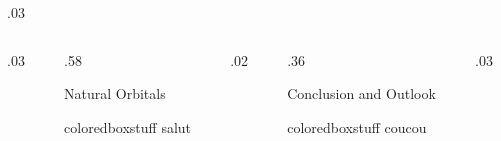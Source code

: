 \documentclass[final, hyperref={pdfpagelabels=false}]{beamer}
\begin{document}
\begin{frame}[t]
\begin{columns}[t]
\begin{column}{.03\textwidth}
\end{column} %
\end{columns} %
\vspace{-0.75em}



\begin{columns}[t]  %

\begin{column}{.03\textwidth}
\end{column} %

\begin{column}{.58\textwidth} %
\begin{block}{\color{cyan!40}Natural Orbitals\vphantom{Xy}}
\begin{beamercolorbox}[wd=\textwidth]{coloredboxstuff}
salut

\end{beamercolorbox}
\end{block}
\end{column}

\begin{column}{.02\textwidth}
\end{column}	%

\begin{column}{.36\textwidth} %
\begin{block}{\color{ta2orange!30!tabutter!30} Conclusion and Outlook\vphantom{Xy}}
\begin{beamercolorbox}[wd=\textwidth]{coloredboxstuff}
coucou

\end{beamercolorbox}
\end{block}
\end{column}

\begin{column}{.03\textwidth}
\end{column} %
\end{columns}
\vspace{-0.75em}



\end{frame}
\end{document}
